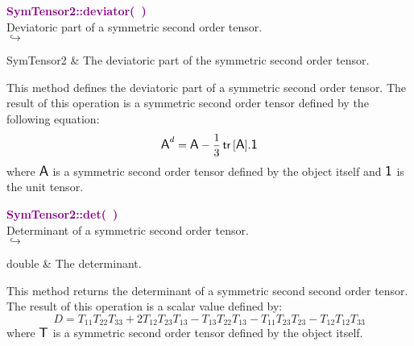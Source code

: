 \textcolor{purple}{\textbf{SymTensor2::deviator(~)}}\label{SymTensor2::deviator()}\\
Deviatoric part of a symmetric second order tensor.\\ \hspace*{5mm}$\hookrightarrow$
\vspace*{-2em}\begin{tcolorbox}[grow to left by=-1cm, width=\textwidth-1cm,myArgs,tabularx={l|R}]
SymTensor2 & The deviatoric part of the symmetric second order tensor.
\end{tcolorbox}

This method defines the deviatoric part of a symmetric second order tensor.
The result of this operation is a symmetric second order tensor defined by the following equation:
\begin{equation*}
\mbox{\large\ensuremath{\mathsf{A}}}^d=\mbox{\large\ensuremath{\mathsf{A}}}-\frac{1}{3}\mbox{\ensuremath{\mathsf{\,tr\,}}}[\mbox{\large\ensuremath{\mathsf{A}}}].\mbox{\large\ensuremath{\mathsf{1}}}
\end{equation*}
where $\mbox{\large\ensuremath{\mathsf{A}}}$ is a symmetric second order tensor defined by the object itself and $\mbox{\large\ensuremath{\mathsf{1}}}$ is the unit tensor.

\textcolor{purple}{\textbf{SymTensor2::det(~)}}\label{SymTensor2::det()}\\
Determinant of a symmetric second order tensor.\\ \hspace*{5mm}$\hookrightarrow$
\vspace*{-2em}\begin{tcolorbox}[grow to left by=-1cm, width=\textwidth-1cm,myArgs,tabularx={l|R}]
double & The determinant.
\end{tcolorbox}

This method returns the determinant of a symmetric second second order tensor.
The result of this operation is a scalar value defined by:
\begin{equation*}
D = T_{11} T_{22} T_{33} + 2 T_{12} T_{23} T_{13} - T_{13} T_{22} T_{13} - T_{11} T_{23} T_{23} - T_{12} T_{12} T_{33}
\end{equation*}
where $\mbox{\large\ensuremath{\mathsf{T}}}$ is a symmetric second order tensor defined by the object itself.

